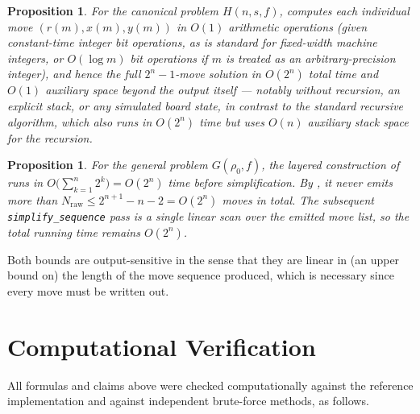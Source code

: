 \documentclass[11pt]{article}
\newtheorem{proposition}[theorem]{Proposition}
\begin{document}
\begin{proposition}
For the canonical problem $H(n,s,f)$,  computes each
individual move $(r(m),x(m),y(m))$ in $O(1)$ arithmetic operations (given
constant-time integer bit operations, as is standard for fixed-width
machine integers, or $O(\log m)$ bit operations if $m$ is treated as an
arbitrary-precision integer), and hence the full $2^n-1$-move solution in
$O(2^n)$ total time and $O(1)$ auxiliary space beyond the output itself
--- notably without recursion, an explicit stack, or any simulated board
state, in contrast to the standard recursive algorithm, which also runs in
$O(2^n)$ time but uses $O(n)$ auxiliary stack space for the recursion.
\end{proposition}

\begin{sloppypar}
\begin{proposition}
For the general problem $G(\rho_0,f)$, the layered construction of
 runs in $O\big(\sum_{k=1}^n 2^k\big) = O(2^n)$ time
before simplification. By , it never emits more than
$N_{\mathrm{raw}} \le 2^{n+1}-n-2 = O(2^n)$ moves in total. The subsequent
\texttt{simplify\_sequence} pass is a single linear scan over the emitted
move list, so the total running time remains $O(2^n)$.
\end{proposition}
\end{sloppypar}

Both bounds are output-sensitive in the sense that they are linear in (an
upper bound on) the length of the move sequence produced, which is
necessary since every move must be written out.

\section{Computational Verification}
\label{sec:verification}

All formulas and claims above were checked computationally against the
reference implementation and against independent brute-force methods, as
follows.
\end{document}
